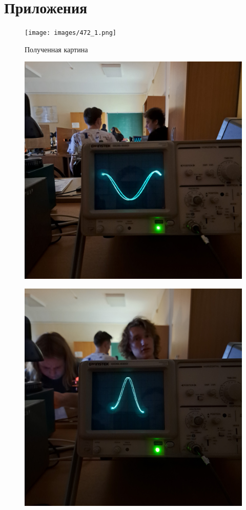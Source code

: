 \documentclass[14pt, a4paper]{report}
\begin{document}
\section{Приложения}

\begin{figure}[H]
\centering
\texttt{[image: images/472\_1.png]}
\caption{Полученная картина}
\end{figure}

\begin{figure}[H]
\centering
\includegraphics[scale=0.1]{images/472_3.jpg}
\end{figure}

\begin{figure}[H]
\centering
\includegraphics[scale=0.1]{images/472_4.jpg}
\end{figure}
\end{document}

